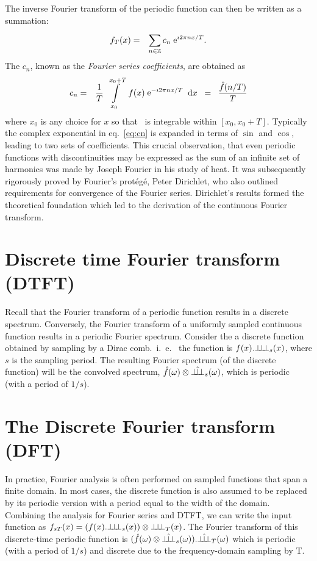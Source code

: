 The inverse Fourier transform of the periodic function can then be written as a summation:
\begin{eqnarray}
  f_{T}(x) & = & \sum\limits_{n\in\mathbb{Z}}^{} c_n \; \mathrm{e}^{\mathrm{\imath} 2\pi n x / T}.
\end{eqnarray}
The $c_n$, known as the \textit{Fourier series coefficients}, are obtained as 
\begin{eqnarray}
\label{eq:cn}  c_n & = & \frac 1 T \; \displaystyle\int\limits_{x_0}^{x_0+T} \; f(x) \; \mathrm{e}^{- \mathrm{\imath} 2\pi n x / T} \;\; \mathrm{d}x \;\; = \;\; \frac {\hat{f} (n/T)} T
\end{eqnarray}
where $x_0$ is any choice for $x$ so that \ifn\ is integrable within $[x_0, x_0+T]$. Typically the complex exponential in eq.~\ref{eq:cn} is expanded in terms of $\sin{}$ and $\cos{}$, leading to two sets of coefficients. This crucial observation, that even periodic functions with discontinuities may be expressed as the sum of an infinite set of harmonics was made by Joseph Fourier in his study of heat. It was subsequently rigorously proved by Fourier's prot\'eg\'e, Peter Dirichlet, who also outlined requirements for convergence of the Fourier series. Dirichlet's results formed the theoretical foundation which led to the derivation of the continuous Fourier transform. 


\section{Discrete time Fourier transform (DTFT)}
Recall that the Fourier transform of a periodic function results in a discrete spectrum. Conversely, the Fourier transform of a uniformly sampled continuous function results in a periodic Fourier spectrum. Consider the a discrete function obtained by sampling by a Dirac comb.~i.~e.~ the function is $f(x) . {\bot\hspace{-.7ex}\bot\hspace{-.7ex}\bot}_{s}(x)$, where $s$ is the sampling period. The resulting Fourier spectrum (of the discrete function) will be the convolved spectrum, $\hat{f}(\omega) \otimes \hat{{\bot\hspace{-.8ex}\bot\hspace{-.8ex}\bot}}_{s}(\omega)$, which is periodic (with a period of $1/s$).


\section{The Discrete Fourier transform (DFT)}
In practice, Fourier analysis is often performed on sampled functions that span a finite domain. In most cases, the discrete function is also assumed to be replaced by its periodic version with a period equal to the width of the domain. Combining the analysis for Fourier series and DTFT, we can write the input function as $f_{sT}(x) = (f(x) . {\bot\hspace{-.7ex}\bot\hspace{-.7ex}\bot}_{s}(x)) \otimes {\bot\hspace{-.7ex}\bot\hspace{-.7ex}\bot}_{T}(x)$. The Fourier transform of this discrete-time periodic function is $(\hat{f}(\omega) \otimes \hat{{\bot\hspace{-.8ex}\bot\hspace{-.8ex}\bot}}_{s}(\omega)) . \hat{{\bot\hspace{-.8ex}\bot\hspace{-.8ex}\bot}}_{T}(\omega)$ which is periodic (with a period of $1/s$) and discrete due to the frequency-domain sampling by \SHAF T.

